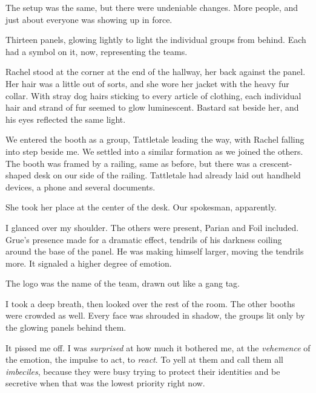 





The setup was the same, but there were undeniable changes.  More people, and just about everyone was showing up in force.



Thirteen panels, glowing lightly to light the individual groups from behind.  Each had a symbol on it, now, representing the teams.



Rachel stood at the corner at the end of the hallway, her back against the panel.  Her hair was a little out of sorts, and she wore her jacket with the heavy fur collar.  With stray dog hairs sticking to every article of clothing, each individual hair and strand of fur seemed to glow luminescent.  Bastard sat beside her, and his eyes reflected the same light.



We entered the booth as a group, Tattletale leading the way, with Rachel falling into step beside me.  We settled into a similar formation as we joined the others.  The booth was framed by a railing, same as before, but there was a crescent-shaped desk on our side of the railing.  Tattletale had already laid out handheld devices, a phone and several documents.



She took her place at the center of the desk.  Our spokesman, apparently.



I glanced over my shoulder.  The others were present, Parian and Foil included.  Grue's presence made for a dramatic effect, tendrils of his darkness coiling around the base of the panel.  He was making himself larger, moving the tendrils more.  It signaled a higher degree of emotion.



The logo was the name of the team, drawn out like a gang tag.



I took a deep breath, then looked over the rest of the room.  The other booths were crowded as well.  Every face was shrouded in shadow, the groups lit only by the glowing panels behind them.



It pissed me off.  I was \emph{surprised} at how much it bothered me, at the \emph{vehemence} of the emotion, the impulse to act, to \emph{react}.  To yell at them and call them all \emph{imbeciles}, because they were busy trying to protect their identities and be secretive when that was the lowest priority right now.



